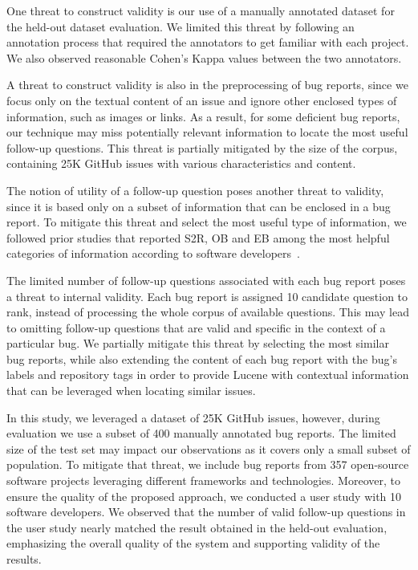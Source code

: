 One threat to construct validity is our use of a manually annotated dataset for the held-out dataset evaluation. We limited this threat by following an annotation process that required the annotators to get familiar with each project. We also observed reasonable Cohen's Kappa values between the two annotators.

A threat to construct validity is also in the preprocessing of bug reports, since we focus only on the textual content of an issue and ignore other enclosed types of information, such as images or links. As a result, for some deficient bug reports, our technique may miss potentially relevant information to locate the most useful follow-up questions. This threat is partially mitigated by the size of the corpus, containing 25K GitHub issues with various characteristics and content.

The notion of utility of a follow-up question poses another threat to validity, since it is based only on a subset of information that can be enclosed in a bug report. To mitigate this threat and select the most useful type of information, we followed prior studies that reported S2R, OB and EB among the most helpful categories of information according to software developers~\cite{Zimmermann2010}.



The limited number of follow-up questions associated with each bug report poses a threat to internal validity. Each bug report is assigned 10 candidate question to rank, instead of processing the whole corpus of available questions. This  may lead to omitting follow-up questions that are valid and specific in the context of a particular bug. We partially mitigate this threat by selecting the most similar bug reports, while also extending the content of each bug report with the bug's labels and repository tags in order to provide Lucene with contextual information that can be leveraged when locating similar issues.


In this study, we leveraged a dataset of 25K GitHub issues, however, during evaluation we use a subset of 400 manually annotated bug reports. The limited size of the test set may impact our observations as it covers only a small subset of population. To mitigate that threat, we include bug reports from 357 open-source software projects leveraging different frameworks and technologies. Moreover, to ensure the quality of the proposed approach, we conducted a user study with 10 software developers. We observed that the number of valid follow-up questions in the user study nearly matched the result obtained in the held-out evaluation, emphasizing the overall quality of the system and supporting validity of the results.

